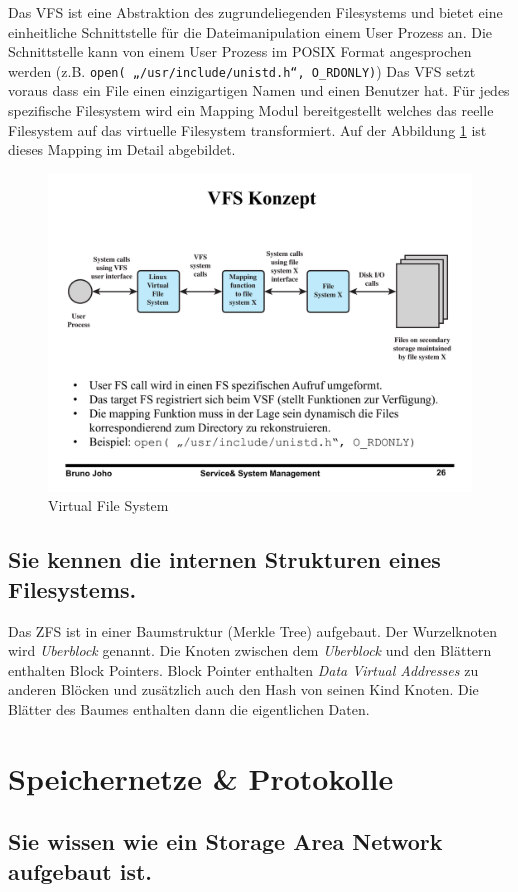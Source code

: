 Das VFS ist eine Abstraktion des zugrundeliegenden Filesystems und bietet eine einheitliche Schnittstelle für die Dateimanipulation einem User Prozess an. Die Schnittstelle kann von einem User Prozess im POSIX Format angesprochen werden (z.B. \texttt{open( „/usr/include/unistd.h“, O\_RDONLY)}) Das VFS setzt voraus dass ein File einen einzigartigen Namen und einen Benutzer hat. Für jedes spezifische Filesystem wird ein Mapping Modul bereitgestellt welches das reelle Filesystem auf das virtuelle Filesystem transformiert. Auf der Abbildung \ref{fig:virtual-file-system} ist dieses Mapping im Detail abgebildet.

\begin{figure}[h!]
\centering
\includegraphics[width=0.7\linewidth]{fig/virtual-file-system}
\caption{Virtual File System}
\label{fig:virtual-file-system}
\end{figure}

\subsection{Sie kennen die internen Strukturen eines Filesystems.}

Das ZFS ist in einer Baumstruktur (Merkle Tree) aufgebaut. Der Wurzelknoten wird \emph{Uberblock} genannt. Die Knoten zwischen dem \emph{Uberblock} und den Blättern enthalten Block Pointers. Block Pointer enthalten \emph{Data Virtual Addresses} zu anderen Blöcken und zusätzlich auch den Hash von seinen Kind Knoten. Die Blätter des Baumes enthalten dann die eigentlichen Daten.

\section{Speichernetze \& Protokolle}

\subsection{Sie wissen wie ein Storage Area Network aufgebaut ist.}

